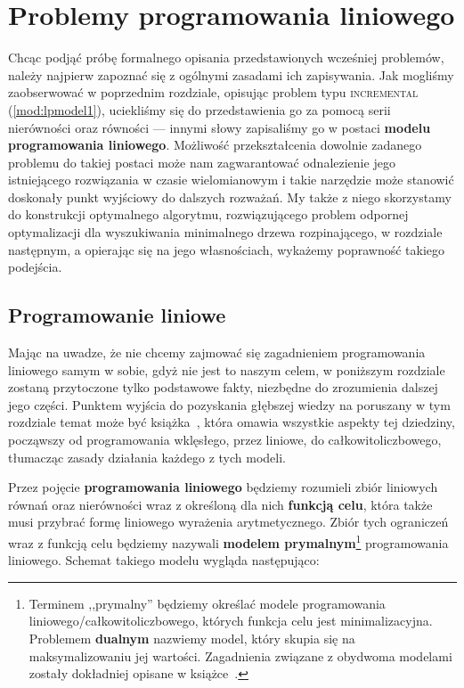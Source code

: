 \chapter{Problemy programowania liniowego}\label{ch:linearprog}
\thispagestyle{chapterBeginStyle}

Chcąc podjąć próbę formalnego opisania przedstawionych wcześniej problemów, należy najpierw zapoznać się z ogólnymi zasadami ich zapisywania. Jak mogliśmy zaobserwować w poprzednim rozdziale, opisując problem typu \textsc{incremental} (\ref{mod:lpmodel1}), uciekliśmy się do przedstawienia go za pomocą serii nierówności oraz równości --- innymi słowy zapisaliśmy go w postaci \textbf{modelu programowania liniowego}. Możliwość przekształcenia dowolnie zadanego problemu do takiej postaci może nam zagwarantować odnalezienie jego istniejącego rozwiązania w czasie wielomianowym i takie narzędzie może stanowić doskonały punkt wyjściowy do dalszych rozważań. My także z niego skorzystamy do konstrukcji optymalnego algorytmu, rozwiązującego problem odpornej optymalizacji dla wyszukiwania minimalnego drzewa rozpinającego, w rozdziale następnym, a opierając się na jego własnościach, wykażemy poprawność takiego podejścia.

\section{Programowanie liniowe}

Mając na uwadze, że nie chcemy zajmować się zagadnieniem programowania liniowego samym w sobie, gdyż nie jest to naszym celem, w poniższym rozdziale zostaną przytoczone tylko podstawowe fakty, niezbędne do zrozumienia dalszej jego części. Punktem wyjścia do pozyskania głębszej wiedzy na poruszany w tym rozdziale temat może być książka~\cite{Papadimitriou:1982:COA:31027}, która omawia wszystkie aspekty tej dziedziny, począwszy od programowania wklęsłego, przez liniowe, do całkowitoliczbowego, tłumacząc zasady działania każdego z tych modeli.

Przez pojęcie \textbf{programowania liniowego} będziemy rozumieli zbiór liniowych równań oraz nierówności wraz z określoną dla nich \textbf{funkcją celu}, która także musi przybrać formę liniowego wyrażenia arytmetycznego. Zbiór tych ograniczeń wraz z funkcją celu będziemy nazywali \textbf{modelem prymalnym}\footnote{Terminem ,,prymalny'' będziemy określać modele programowania liniowego/całkowitoliczbowego, których funkcja celu jest minimalizacyjna. Problemem \textbf{dualnym} nazwiemy model, który skupia się na maksymalizowaniu jej wartości. Zagadnienia związane z obydwoma modelami zostały dokładniej opisane w książce~\cite[$67$--$73$]{Papadimitriou:1982:COA:31027}.} programowania liniowego. Schemat takiego modelu wygląda następująco:

